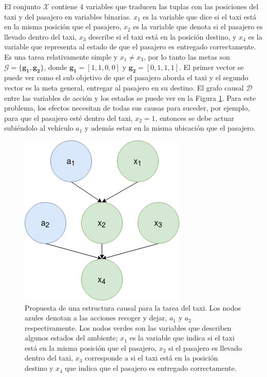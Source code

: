 El conjunto $\mathcal{X}$ contiene 4 variables que traducen las tuplas con las posiciones del taxi y del pasajero en variables binarias. $x_1$
es la variable que dice si el taxi está en la misma posición que el
pasajero, $x_2$ es la variable que denota si el pasajero es llevado dentro del taxi, $x_3$ describe si el taxi está en la posición destino,
y $x_4$ es la variable que representa al estado de que el pasajero es entregado correctamente. Es una tarea relativamente simple y $x_1 \neq x_3$, por lo tanto las metas son $\mathcal{G} = \{\mathbf{g_1}, \mathbf{g_2}\}$, donde $\mathbf{g_1} = [1, 1, 0 , 0]$ y $\mathbf{g_2} = [0,1,1,1]$. El primer vector se puede ver como el sub objetivo de que el pasajero aborda el taxi y el segundo vector es la meta general, 
entregar al pasajero en su destino.
El grafo causal $\mathcal{D}$ entre las variables de acción y los estados se puede 
ver en la Figura \ref{fig:cm-taxi}. Para este problema, los efectos
necesitan de todas sus causas para suceder, por ejemplo, para que el
pasajero esté dentro del taxi, $x_2 = 1$, entonces se debe actuar
subiéndolo al vehículo $a_1$ y además estar en la misma ubicación que
el pasajero.

\begin{figure}
    \centering
    \includegraphics[scale=0.3]{Chapter5/Figs/causal_structure_taxi.png}
    \caption{Propuesta de una estructura causal para la tarea del taxi. Los nodos azules
    denotan a las acciones recoger y dejar, $a_1$ y $a_2$ respectivamente. Los nodos verdes son las variables que describen algunos estados del ambiente; $x_1$
es la variable que indica si el taxi está en la misma posición que el
pasajero, $x_2$  si el pasajero es llevado dentro del taxi, $x_3$ corresponde a si el taxi está en la posición destino y $x_4$ que indica que el pasajero es entregado correctamente.}
    \label{fig:cm-taxi}
\end{figure}


